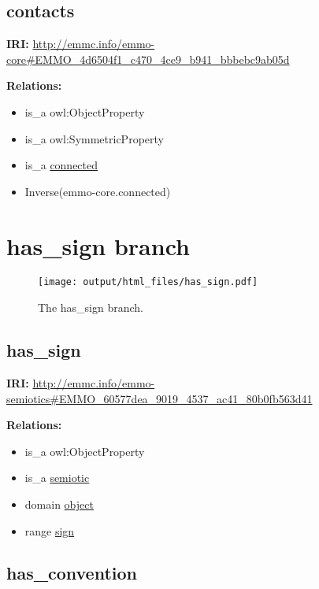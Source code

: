 \documentclass[a4paper,]{report}
\providecommand{\tightlist}{%
  \setlength{\itemsep}{0pt}\setlength{\parskip}{0pt}}
\begin{document}
\hypertarget{contacts}{%
\subsection{contacts}\label{contacts}}

\textbf{IRI:}
\url{http://emmc.info/emmo-core\#EMMO_4d6504f1_c470_4ce9_b941_bbbebc9ab05d}

\textbf{Relations:}

\begin{itemize}
\tightlist
\item
  is\_a owl:ObjectProperty
\item
  is\_a owl:SymmetricProperty
\item
  is\_a \protect\hyperlink{connected}{connected}
\item
  Inverse(emmo-core.connected)
\end{itemize}

\hypertarget{has_sign-branch}{%
\section{has\_sign branch}\label{has_sign-branch}}

\begin{figure}
\centering
\texttt{[image: output/html\_files/has\_sign.pdf]}
\caption{The has\_sign branch.}
\end{figure}

\hypertarget{has_sign}{%
\subsection{has\_sign}\label{has_sign}}

\textbf{IRI:}
\url{http://emmc.info/emmo-semiotics\#EMMO_60577dea_9019_4537_ac41_80b0fb563d41}

\textbf{Relations:}

\begin{itemize}
\tightlist
\item
  is\_a owl:ObjectProperty
\item
  is\_a \protect\hyperlink{semiotic}{semiotic}
\item
  domain \protect\hyperlink{object}{object}
\item
  range \protect\hyperlink{sign}{sign}
\end{itemize}

\hypertarget{has_convention}{%
\subsection{has\_convention}\label{has_convention}}
\end{document}
